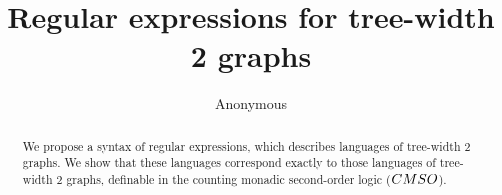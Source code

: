 \documentclass[a4paper,UKenglish,cleveref, autoref, thm-restate]{lipics-v2021}
\title{Regular expressions for  tree-width 2 graphs}
\author{Anonymous}{Anonymous}{}{}{}
\begin{document}
\maketitle

\begin{abstract}
We propose a syntax of regular expressions, which describes languages of tree-width 2 graphs. We show that these languages correspond exactly to those languages of tree-width $2$ graphs, definable in the counting monadic second-order logic ($\CMSO$). 
\end{abstract}



%







\clearpage



\end{document}
